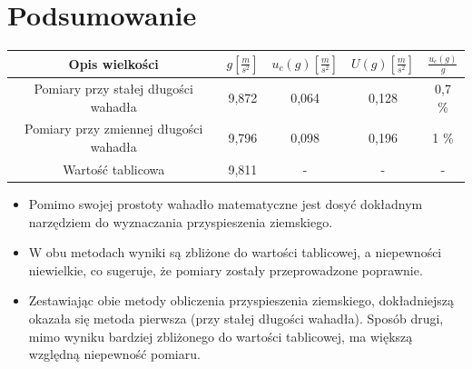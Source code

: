 \documentclass [a4paper,11pt]{article}
\begin{document}
	\section{Podsumowanie}
	\begin{center}
	\begin{tabular}{|c|c|c|c|c|}
		\hline Opis wielkości & $g \left[ \frac{m}{s^2} \right]$ & $u_c(g) \left[ \frac{m}{s^2} \right]$ & $U(g) \left[ \frac{m}{s^2} \right]$ & $ \frac{u_c(g)}{g} $\\
		\hline Pomiary przy stałej długości wahadła  & 9,872 & 0,064  & 0,128 & 0,7 \% \\ 
		\hline Pomiary przy zmiennej długości wahadła & 9,796  & 0,098  & 0,196 &  1 \%\\ 
		\hline Wartość tablicowa & 9,811  & -  & - & - \\ 
		\hline 
	\end{tabular} 
	\end{center}
	\hspace{1em}
	\begin{itemize}
		\item Pomimo swojej prostoty wahadło matematyczne jest dosyć dokładnym narzędziem do wyznaczania przyspieszenia ziemskiego. 
		
		\item W obu metodach wyniki są zbliżone do wartości tablicowej, a niepewności niewielkie, co sugeruje, że pomiary zostały przeprowadzone poprawnie.
		
		\item Zestawiając obie metody obliczenia przyspieszenia ziemskiego, dokładniejszą okazała się metoda pierwsza (przy stałej długości wahadła). Sposób drugi, mimo wyniku bardziej zbliżonego do wartości tablicowej, ma większą względną niepewność pomiaru.
	\end{itemize}
\end{document}
